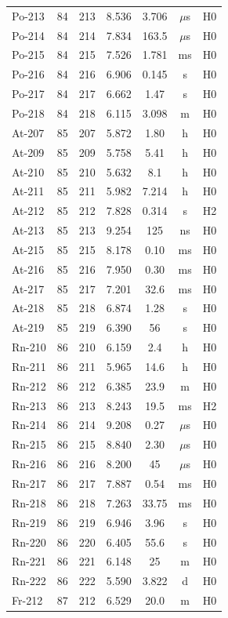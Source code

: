 \documentclass[11pt,a4paper]{article}
\begin{document}
\begin{small}
\begin{longtable}{lcccccc}
Po-213 & 84 & 213 & 8.536 & 3.706 & $\mu$s & H0 \\
Po-214 & 84 & 214 & 7.834 & 163.5 & $\mu$s & H0 \\
Po-215 & 84 & 215 & 7.526 & 1.781 & ms & H0 \\
Po-216 & 84 & 216 & 6.906 & 0.145 & s & H0 \\
Po-217 & 84 & 217 & 6.662 & 1.47 & s & H0 \\
Po-218 & 84 & 218 & 6.115 & 3.098 & m & H0 \\
At-207 & 85 & 207 & 5.872 & 1.80 & h & H0 \\
At-209 & 85 & 209 & 5.758 & 5.41 & h & H0 \\
At-210 & 85 & 210 & 5.632 & 8.1 & h & H0 \\
At-211 & 85 & 211 & 5.982 & 7.214 & h & H0 \\
At-212 & 85 & 212 & 7.828 & 0.314 & s & H2 \\
At-213 & 85 & 213 & 9.254 & 125 & ns & H0 \\
At-215 & 85 & 215 & 8.178 & 0.10 & ms & H0 \\
At-216 & 85 & 216 & 7.950 & 0.30 & ms & H0 \\
At-217 & 85 & 217 & 7.201 & 32.6 & ms & H0 \\
At-218 & 85 & 218 & 6.874 & 1.28 & s & H0 \\
At-219 & 85 & 219 & 6.390 & 56 & s & H0 \\
Rn-210 & 86 & 210 & 6.159 & 2.4 & h & H0 \\
Rn-211 & 86 & 211 & 5.965 & 14.6 & h & H0 \\
Rn-212 & 86 & 212 & 6.385 & 23.9 & m & H0 \\
Rn-213 & 86 & 213 & 8.243 & 19.5 & ms & H2 \\
Rn-214 & 86 & 214 & 9.208 & 0.27 & $\mu$s & H0 \\
Rn-215 & 86 & 215 & 8.840 & 2.30 & $\mu$s & H0 \\
Rn-216 & 86 & 216 & 8.200 & 45 & $\mu$s & H0 \\
Rn-217 & 86 & 217 & 7.887 & 0.54 & ms & H0 \\
Rn-218 & 86 & 218 & 7.263 & 33.75 & ms & H0 \\
Rn-219 & 86 & 219 & 6.946 & 3.96 & s & H0 \\
Rn-220 & 86 & 220 & 6.405 & 55.6 & s & H0 \\
Rn-221 & 86 & 221 & 6.148 & 25 & m & H0 \\
Rn-222 & 86 & 222 & 5.590 & 3.822 & d & H0 \\
Fr-212 & 87 & 212 & 6.529 & 20.0 & m & H0 \\

\end{longtable}
\end{small}
\end{document}
